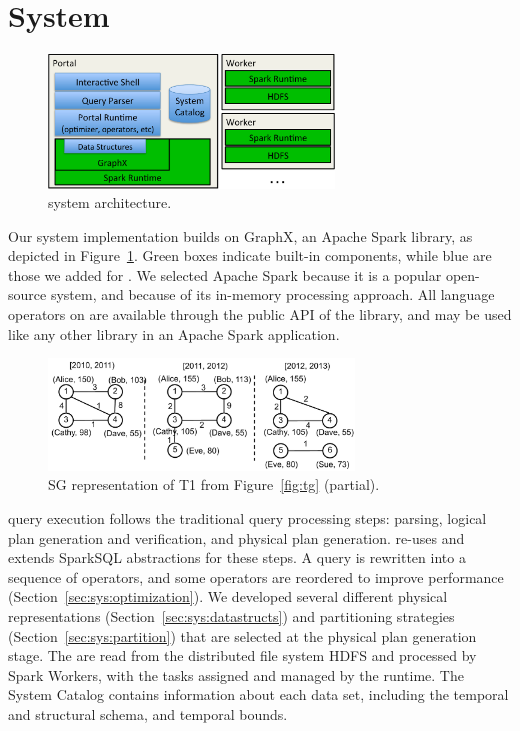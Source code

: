 \section{System}
\label{sec:sys}

\begin{figure}[t!]
\begin{center}
\includegraphics[height=1.4in]{figs/architecture.pdf}
\caption{\ql system architecture.}
\label{fig:arch}
\end{center}
\end{figure}

Our \ql system implementation builds on GraphX, an Apache Spark
library, as depicted in Figure~\ref{fig:arch}.  Green boxes indicate
built-in components, while blue are those we added for \ql.  We
selected Apache Spark because it is a popular open-source system, and
because of its in-memory processing approach.  All language operators
on \tgs are available through the public API of the \ql library, and
may be used like any other library in an Apache Spark application.

\begin{figure}[t!]
\includegraphics[width=3.2in]{figs/sgp.pdf}
\caption{SG representation of T1 from Figure~\ref{fig:tg} (partial).}
\label{fig:sgp}
\end{figure}

\ql query execution follows the traditional query processing steps:
parsing, logical plan generation and verification, and physical plan
generation.  \ql re-uses and extends SparkSQL abstractions for these
steps.  A \ql query is rewritten into a sequence of operators, and
some operators are reordered to improve performance
(Section~\ref{sec:sys:optimization}).  We developed several different
physical representations (Section~\ref{sec:sys:datastructs}) and
partitioning strategies (Section~\ref{sec:sys:partition}) that are
selected at the physical plan generation stage.  The \tgs are read
from the distributed file system HDFS and processed by Spark Workers,
with the tasks assigned and managed by the runtime.  The System
Catalog contains information about each data set, including the
temporal and structural schema, and temporal bounds.

